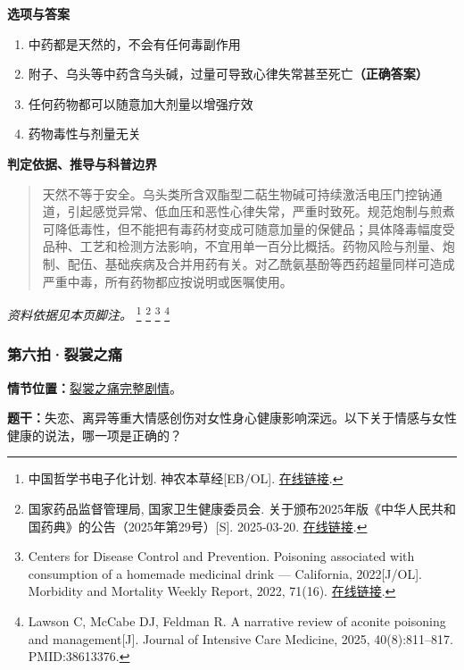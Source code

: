 \textbf{选项与答案}
\begin{enumerate}[label=\Alph*.,leftmargin=*]
  \item 中药都是天然的，不会有任何毒副作用
  \item 附子、乌头等中药含乌头碱，过量可导致心律失常甚至死亡\textbf{（正确答案）}
  \item 任何药物都可以随意加大剂量以增强疗效
  \item 药物毒性与剂量无关
\end{enumerate}
\textbf{判定依据、推导与科普边界}
\begin{quote}天然不等于安全。乌头类所含双酯型二萜生物碱可持续激活电压门控钠通道，引起感觉异常、低血压和恶性心律失常，严重时致死。规范炮制与煎煮可降低毒性，但不能把有毒药材变成可随意加量的保健品；具体降毒幅度受品种、工艺和检测方法影响，不宜用单一百分比概括。药物风险与剂量、炮制、配伍、基础疾病及合并用药有关。对乙酰氨基酚等西药超量同样可造成严重中毒，所有药物都应按说明或医嘱使用。\end{quote}
\noindent\textit{资料依据见本页脚注。}
\footnote{中国哲学书电子化计划. 神农本草经[EB/OL]. \href{https://jicheng.tw/tcm/book/神農本草經_2/index.html}{在线链接}.}
\footnote{国家药品监督管理局, 国家卫生健康委员会. 关于颁布2025年版《中华人民共和国药典》的公告（2025年第29号）[S]. 2025-03-20. \href{https://www.nmpa.gov.cn/xxgk/fgwj/gzwj/gzwjyp/20250325183810122.html}{在线链接}.}
\footnote{Centers for Disease Control and Prevention. Poisoning associated with consumption of a homemade medicinal drink — California, 2022[J/OL]. Morbidity and Mortality Weekly Report, 2022, 71(16). \href{https://www.cdc.gov/mmwr/volumes/71/wr/mm7116a2.htm}{在线链接}.}
\footnote{Lawson C, McCabe DJ, Feldman R. A narrative review of aconite poisoning and management[J]. Journal of Intensive Care Medicine, 2025, 40(8):811–817. PMID:38613376.}

\subsubsection{第六拍·裂裳之痛}\label{question:zhouzhiruo:6}
\textbf{情节位置：}\hyperref[plot:zhouzhiruo:6]{裂裳之痛完整剧情}。

\textbf{题干：}失恋、离异等重大情感创伤对女性身心健康影响深远。以下关于情感与女性健康的说法，哪一项是正确的？

